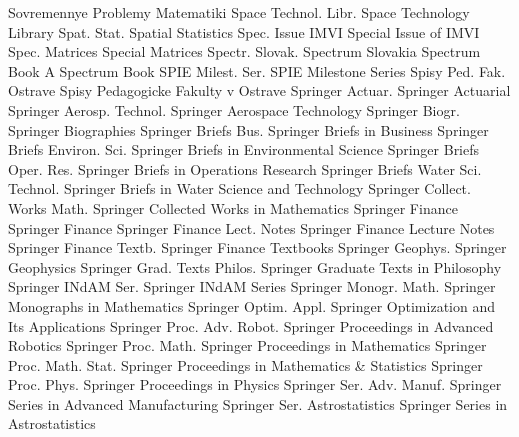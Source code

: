 {Sovremennye Problemy Matematiki}
{Space Technol. Libr.}
{Space Technology Library}
{Spat. Stat.}
{Spatial Statistics}
{Spec. Issue IMVI}
{Special Issue of IMVI}
{Spec. Matrices}
{Special Matrices}
{Spectr. Slovak.}
{Spectrum Slovakia}
{Spectrum Book}
{A Spectrum Book}
{SPIE Milest. Ser.}
{SPIE Milestone Series}
{Spisy Ped. Fak. Ostrave}
{Spisy Pedagogicke Fakulty v Ostrave}
{Springer Actuar.}
{Springer Actuarial}
{Springer Aerosp. Technol.}
{Springer Aerospace Technology}
{Springer Biogr.}
{Springer Biographies}
{Springer Briefs Bus.}
{Springer Briefs in Business}
{Springer Briefs Environ. Sci.}
{Springer Briefs in Environmental Science}
{Springer Briefs Oper. Res.}
{Springer Briefs in Operations Research}
{Springer Briefs Water Sci. Technol.}
{Springer Briefs in Water Science and Technology}
{Springer Collect. Works Math.}
{Springer Collected Works in Mathematics}
{Springer Finance}
{Springer Finance}
{Springer Finance Lect. Notes}
{Springer Finance Lecture Notes}
{Springer Finance Textb.}
{Springer Finance Textbooks}
{Springer Geophys.}
{Springer Geophysics}
{Springer Grad. Texts Philos.}
{Springer Graduate Texts in Philosophy}
{Springer INdAM Ser.}
{Springer INdAM Series}
{Springer Monogr. Math.}
{Springer Monographs in Mathematics}
{Springer Optim. Appl.}
{Springer Optimization and Its Applications}
{Springer Proc. Adv. Robot.}
{Springer Proceedings in Advanced Robotics}
{Springer Proc. Math.}
{Springer Proceedings in Mathematics}
{Springer Proc. Math. Stat.}
{Springer Proceedings in Mathematics & Statistics}
{Springer Proc. Phys.}
{Springer Proceedings in Physics}
{Springer Ser. Adv. Manuf.}
{Springer Series in Advanced Manufacturing}
{Springer Ser. Astrostatistics}
{Springer Series in Astrostatistics}
